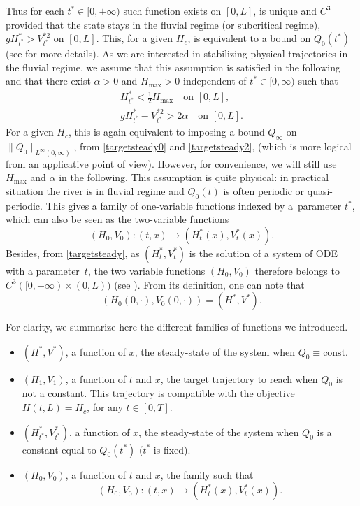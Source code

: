 \documentclass[JEP,XML,SOM,Unicode]{cedram}
\theoremstyle{definition}
\begin{document}
Thus for each $t^{*}\in[0,+\infty)$ such function exists on $[0,L]$, is unique and $C^{3}$ provided that the state stays in the fluvial regime (or subcritical regime), \ie $g H_{t^{*}}^{*}>V^{*2}_{t^{*}}$ on $[0,L]$.
This, for a given $H_{c}$, is equivalent to a bound on $Q_{0}(t^{*})$
(see \cite{HS} for more details).
As we are interested in {stabilizing} physical trajectories in the fluvial regime, we assume that this assumption is satisfied {in the following} and that
there exist $\alpha>0$ and $H_{\max}>0$ independent of $t^{*}\in[0,\infty)$ such that
\begin{equation}
\begin{split}
H_{t^{*}}^{*}<\frac{1}{2}H_{\max}\quad\text{on }[0,L],\\
gH_{t^{*}}^{*}-V_{{t^{*}}}^{*2}>2\alpha\quad\text{on }[0,L].
\end{split}
\label{fluvial0}
\end{equation}
For a given $H_{c}$, this is again equivalent to imposing a bound $Q_{\infty}$ on $\lVert Q_{0}\rVert_{L^{\infty}(0,\infty)}$, from \eqref{targetsteady0} and \eqref{targetsteady2},
(which is more logical {from an applicative point of view}).
However, for convenience, we will still use $H_{\max}$ and $\alpha$ in the following. This assumption is quite physical: in practical situation the river is in fluvial regime and $Q_{0}(t)$ is often periodic or quasi-periodic.
This gives a family of one-variable functions indexed by a~parameter $t^{*}$, which can also be seen as the two-variable functions
\begin{equation*}
(H_{0},V_{0}) : (t,x)\to (H^{*}_{t}(x),V^{*}_{t}(x)).
\end{equation*}
Besides, from \eqref{targetsteady}, as $(H_{t}^{*},V_{t}^{*})$
is the solution of a system of ODE with a parameter~$t$, the two variable functions $(H_{0},V_{0})$ therefore belongs to $C^{3}([0,+\infty)\times(0,L))$ (see \cite[Chap.\,5, Cor.\,4.1]{Hartman}).
{From} its definition, one can note that
\[
(H_{0}(0,\cdot),V_{0}(0,\cdot))=(H^{*},V^{*}).
\]

For clarity, we summarize here the different families of functions we introduced.
\begin{itemize}
\item
$(H^{*},V^{*})$, a function of $x$, the steady-state of the system when $Q_{0}\equiv \text{const.}$
\item
$(H_{1},V_{1})$, a function of $t$ and $x$, the target trajectory to reach when $Q_{0}$ is not a
constant. This trajectory is compatible with the objective $H(t,L) = H_{c}$, for any $t\in [0,T]$.
\item
$(H^{*}_{t^{*}},V^{*}_{t^{*}})$, a function of $x$, the steady-state of the system when $Q_{0}$ is a constant equal to $Q_{0}({t^{*}})$ ($t^{*}$ is fixed).
\item
$(H_{0},V_{0})$, a function of $t$ and $x$, the family such that
\[
(H_{0}, V_{0}):(t,x) \to (H_{t}^{*}(x),V^{*}_{t}(x)).
\]
\end{itemize}
\end{document}
